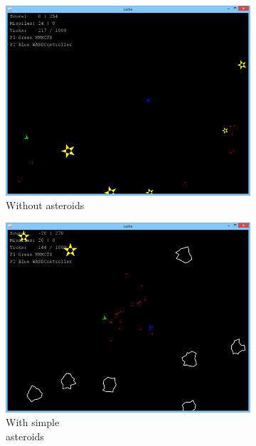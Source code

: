 \begin{figure}
	\caption{Screenshots from the three game modes.}
	\begin{subfigure}[b]{0.45\textwidth}
		\center
		\includegraphics[scale=0.51]{resources/gamemode2}
		\caption{Without asteroids}
	\end{subfigure}
	\begin{subfigure}[b]{0.45\textwidth}
		\center
		\includegraphics[scale=0.51]{resources/gamemode1}
		\caption{With simple\\asteroids}
	\end{subfigure}
	\begin{subfigure}[b]{0.45\textwidth}

\end{subfigure}
\end{figure}
